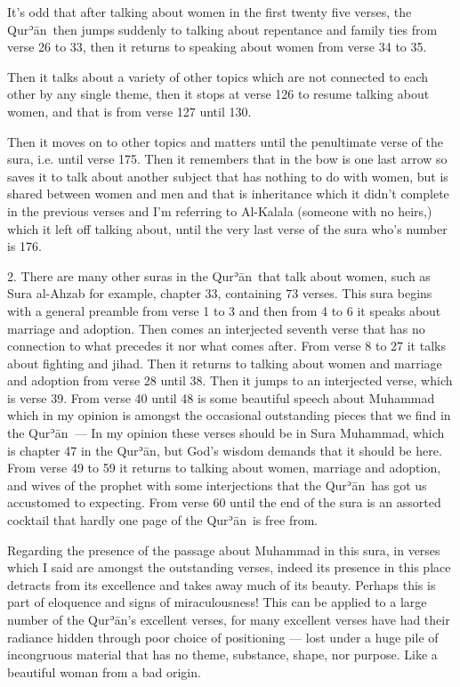 \documentclass[12pt]{memoir}
\def\´{ʾ} %
\def \Quran{Qur\-\´ān} %
\def\–{-\hskip0pt}
\def\fnmarksym[#1]{\def\thefootnote{#1}\footnotemark%
\addtocounter{footnote}{-1}}
\begin{document}
It’s odd that after talking about women in the first twenty five verses,
the \Quran\ then jumps suddenly to talking about repentance
and family ties from verse 26 to 33,
then it returns to speaking about women from verse 34 to 35.

Then it talks about a variety of other topics
which are not connected to each other by any single theme,
then it stops at verse 126 to resume talking about women,
and that is from verse 127 until 130.

Then it moves on to other topics and matters until the penultimate verse
of the sura, i.e. until verse 175.
Then it remembers that in the bow is one last arrow
so saves it to talk about another subject that has nothing to do with women,
but is shared between women and men and that is inheritance
which it didn’t complete in the previous verses
and I’m referring to Al\–Kalala (someone with no heirs,)
which it left off talking about,
until the very last verse of the sura who’s number is 176.

2. There are many other suras in the \Quran\ that talk about women,
such as Sura al\–Ahzab for example, chapter 33, containing 73 verses.
This sura begins with a general preamble from verse 1 to 3
and then from 4 to 6 it speaks about marriage and adoption.
Then comes an interjected seventh verse that has no connection
to what precedes it nor what comes after.
From verse 8 to 27 it talks about fighting and jihad.
Then it returns to talking about women and marriage
and adoption from verse 28 until 38.
Then it jumps to an interjected verse, which is verse 39.
From verse 40 until 48 is some beautiful speech about Muhammad
which in my opinion is amongst the occasional outstanding pieces
that we find in the \Quran\ —
In my opinion these verses should be in Sura Muhammad,
which is chapter 47 in the \Quran, but God’s wisdom demands
that it should be here.
From verse 49 to 59 it returns to talking about women,
marriage and adoption, and wives of the prophet with some interjections
that the \Quran\ has got us accustomed to expecting.
From verse 60 until the end of the sura is an assorted cocktail
that hardly one page of the \Quran\ is free from.

Regarding the presence of the passage about Muhammad in this sura,
in verses which I said are amongst the outstanding verses,
indeed its presence in this place detracts from its excellence
and takes away much of its beauty.
Perhaps this is part of eloquence and signs of miraculousness!
This can be applied to a large number of the \Quran’s excellent verses,
for many excellent verses have had their radiance hidden
through poor choice of positioning —
lost under a huge pile of incongruous material
that has no theme, substance, shape, nor purpose.
Like a beautiful woman from a bad origin.\fnmarksym[*]
\end{document}
